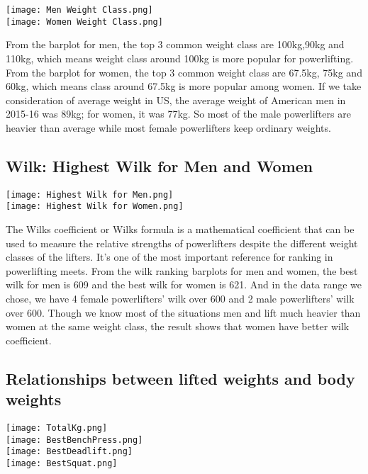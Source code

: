 \documentclass{article}
\begin{document}
\texttt{[image: Men Weight Class.png]}\\
\texttt{[image: Women Weight Class.png]}

From the barplot for men, the top 3 common weight class are 100kg,90kg and 110kg, which means weight class around 100kg is more popular for powerlifting. From the barplot for women, the top 3 common weight class are 67.5kg, 75kg and 60kg, which means class around 67.5kg is more popular among women. 
If we take consideration of average weight in US, the average weight of American men in 2015-16 was 89kg; for women, it was 77kg. So most of the male powerlifters are heavier than average while most female powerlifters keep ordinary weights.


\subsection{Wilk: Highest Wilk for Men and Women}

\texttt{[image: Highest Wilk for Men.png]}\\
\texttt{[image: Highest Wilk for Women.png]}

The Wilks coefficient or Wilks formula is a mathematical coefficient that can be used to measure the relative strengths of powerlifters despite the different weight classes of the lifters. It's one of the most important reference for ranking in powerlifting meets. From the wilk ranking barplots for men and women, the best wilk for men is 609 and the best wilk for women is 621. And in the data range we chose, we have 4 female powerlifters' wilk over 600 and 2 male powerlifters' wilk over 600.
Though we know most of the situations men and lift much heavier than women at the same weight class, the result shows that women have better wilk coefficient.

\subsection{Relationships between lifted weights and body weights}

\texttt{[image: TotalKg.png]}\\
\texttt{[image: BestBenchPress.png]}\\
\texttt{[image: BestDeadlift.png]}\\
\texttt{[image: BestSquat.png]}
\end{document}
